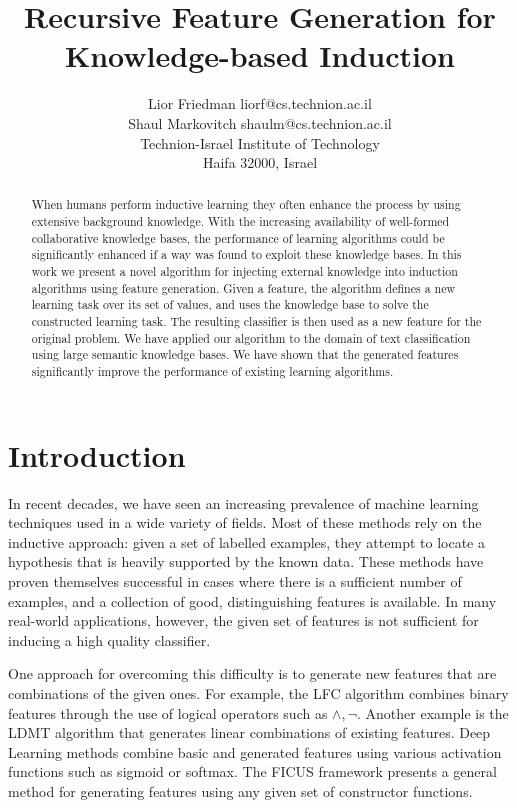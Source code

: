 \documentclass[twoside,11pt]{article}
\title{Recursive Feature Generation for Knowledge-based Induction}
\author{\name Lior Friedman \email liorf@cs.technion.ac.il \\
	\name Shaul Markovitch \email shaulm@cs.technion.ac.il \\
	\addr Technion-Israel Institute of Technology\\
	Haifa 32000, Israel
}
\theoremstyle{definition}
\begin{document}
	
\maketitle
	
\begin{abstract}
	When humans perform inductive learning they often enhance the process by using extensive background knowledge.
	With the increasing availability of well-formed collaborative knowledge bases, the performance of learning algorithms could
	 be significantly enhanced if a way was found to exploit these knowledge bases. 
	In this work we present a novel algorithm for injecting external knowledge into induction algorithms using feature generation. Given a feature, the algorithm defines a new learning task over its set of values, and uses the knowledge base to solve the constructed learning task. The resulting classifier is then used as a new feature for the original problem.
	We have applied our algorithm to the domain of text classification using large semantic knowledge bases. We have shown that the generated features significantly improve the performance of existing learning algorithms.
\end{abstract}

\section{Introduction}
\label{sec:Intro}
In recent decades, we have seen an increasing prevalence of machine learning techniques used in a wide variety of fields. %
Most of these methods rely on the inductive approach: given a set of labelled examples, they attempt to locate a hypothesis that is heavily supported by the known data. These methods have proven themselves successful in cases where there is a sufficient number of examples, and a collection of good,
distinguishing features is available.
In many real-world applications, however, the given set of features is not sufficient for inducing a high quality classifier.

One approach for overcoming this difficulty is to generate new features that are combinations of the given ones.
For example, the LFC algorithm  combines binary features through the use of logical operators such as $\land ,\lnot$.
Another example is the LDMT algorithm \cite{utgo1991linear} that generates linear combinations of existing features.
Deep Learning methods combine basic and generated features using various activation functions such as sigmoid or softmax.
The FICUS framework \cite{markovitch2002feature} presents a general method for generating features using any given set of constructor functions.
\end{document}
